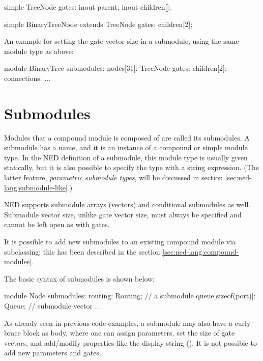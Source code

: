 \begin{ned}
simple TreeNode {
    gates:
        inout parent;
        inout children[];
}

simple BinaryTreeNode extends TreeNode {
    gates:
        children[2];
}
\end{ned}

An example for setting the gate vector size in a submodule, using the same
 module type as above:

\begin{ned}
module BinaryTree {
    submodules:
        nodes[31]: TreeNode {
            gates:
                children[2];
        }
    connections:
        ...
}
\end{ned}



\section{Submodules}
\label{sec:ned-lang:submodules}

Modules that a compound module is composed of are called its submodules.
A submodule has a name, and it is an instance of a compound or simple
module type. In the NED definition of a submodule, this module type
is usually given statically, but it is also possible to specify the type
with a string expression. (The latter feature, \textit{parametric submodule
types}, will be discussed in section \ref{sec:ned-lang:submodule-like}.)

NED supports submodule arrays (vectors) and conditional submodules as well.
Submodule vector size, unlike gate vector size, must always be specified
and cannot be left open as with gates.

It is possible to add new submodules to an existing compound module via
subclassing; this has been described in the section
\ref{sec:ned-lang:compound-modules}.

The basic syntax of submodules is shown below:

\begin{ned}
module Node
{
    submodules:
        routing: Routing;   // a submodule
        queue[sizeof(port)]: Queue;  // submodule vector
        ...
}
\end{ned}

As already seen in previous code examples, a submodule may also have a
curly brace block as body, where one can assign parameters, set the size of
gate vectors, and add/modify properties like the display string
(). It is not possible to add new parameters and gates.

